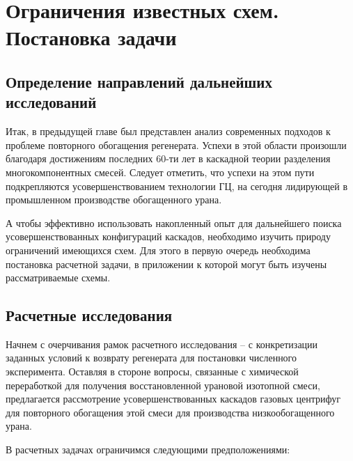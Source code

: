 \chapter{Ограничения известных схем. Постановка задачи}\label{ch:ch2}

\section{Определение направлений дальнейших исследований}
Итак, в предыдущей главе был представлен анализ современных подходов к проблеме повторного обогащения регенерата.
Успехи в этой области произошли благодаря достижениям последних 60-ти лет в каскадной теории разделения многокомпонентных смесей.
Следует отметить, что успехи на этом пути подкрепляются усовершенствованием технологии ГЦ, на сегодня лидирующей в промышленном производстве обогащенного урана.

А чтобы эффективно использовать накопленный опыт для дальнейшего поиска усовершенствованных конфигураций каскадов, необходимо изучить природу ограничений имеющихся схем. Для этого в первую очередь необходима постановка расчетной задачи, в приложении к которой могут быть изучены рассматриваемые схемы.

\section{Расчетные исследования}

Начнем с очерчивания рамок расчетного исследования -- с конкретизации заданных условий к возврату регенерата для постановки численного эксперимента.
Оставляя в стороне вопросы, связанные с химической переработкой для получения восстановленной урановой изотопной смеси, предлагается рассмотрение усовершенствованных каскадов газовых центрифуг для повторного обогащения этой смеси для производства низкообогащенного урана. 

В расчетных задачах ограничимся следующими предположениями:

